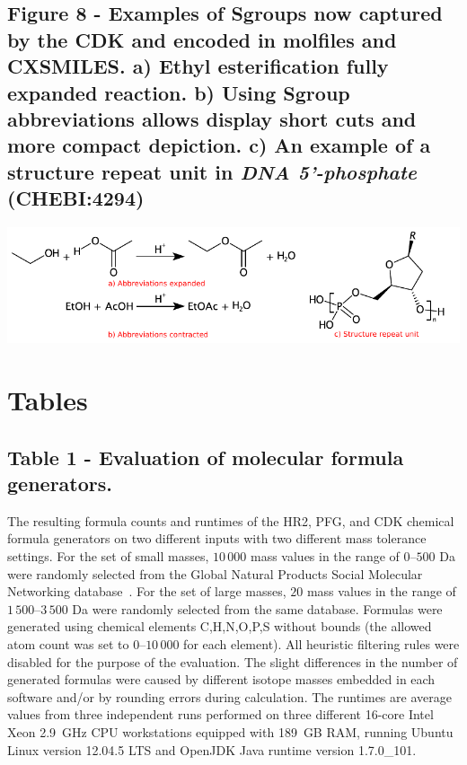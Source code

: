 \documentclass[10pt]{bmcart}
\begin{document}
\begin{backmatter}
\subsection*{Figure 8 - Examples of Sgroups now captured by the CDK and encoded in molfiles and CXSMILES. a) Ethyl esterification fully expanded reaction. b) Using Sgroup abbreviations allows display short cuts and more compact depiction. c) An example of a structure repeat unit in \textit{DNA 5'-phosphate} (\textbf{CHEBI:4294})}
\label{fig:sgroups}
      

\includegraphics[width=\textwidth]{img/sgroups.pdf}


\newpage


\newpage

\section*{Tables}


  \subsection*{Table 1 - Evaluation of molecular formula generators.}
  \label{tab:formula_generators}
  The resulting formula counts and runtimes of the HR2, PFG, and CDK chemical
formula generators on two different inputs with two different mass tolerance
settings. For the set of small masses, $10\,000$ mass values in the range of
$0$--$500$ Da were randomly selected from the Global Natural Products Social
Molecular Networking database~\cite{wang2016}. For the set of large masses, $20$
mass values in the range of $1\,500$--$3\,500$ Da were randomly selected from the same
database. Formulas were generated using chemical elements C,H,N,O,P,S without
bounds (the allowed atom count was set to $0$--$10\,000$ for each element). All
heuristic filtering rules were disabled for the purpose of the evaluation. The
slight differences in the number of generated formulas were caused by different
isotope masses embedded in each software and/or by rounding errors during
calculation. The runtimes are average values from three independent runs
performed on three different 16-core Intel Xeon 2.9~GHz CPU workstations
equipped with 189~GB RAM, running Ubuntu Linux version 12.04.5 LTS and OpenJDK
Java runtime version 1.7.0\_101.
  \baselineskip


\end{backmatter}
\end{document}
